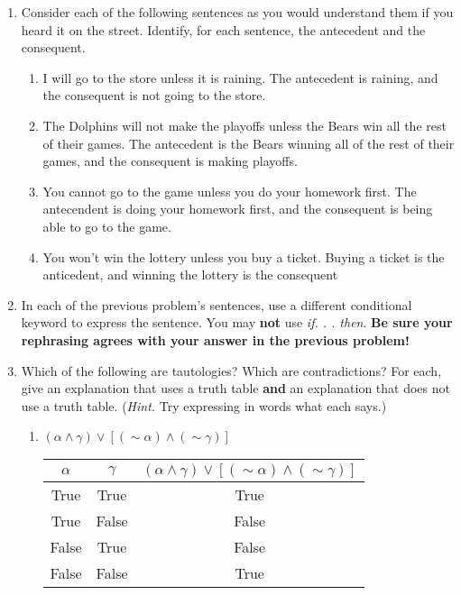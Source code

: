 \documentclass{letter}
\begin{document}
\begin{description}
\begin{enumerate}
\begin{enumerate}
	\end{enumerate}
	\item Consider each of the following sentences as you would understand them if you heard it on the street. Identify, for each sentence, the antecedent and the consequent.
			\begin{enumerate}\itemsep=1.25mm
				\item I will go to the store unless it is raining. The antecedent is raining, and the consequent is not going to the store.
				\item The Dolphins will not make the playoffs unless the Bears win all the rest of their games. The antecedent is the Bears winning all of the rest of their games, and the consequent is making playoffs. \\
				\item You cannot go to the game unless you do your homework first. The antecendent is doing your homework first, and the consequent is being able to go to the game. \\
				\item You won't win the lottery unless you buy a ticket. Buying a ticket is the anticedent, and winning the lottery is the consequent
			\end{enumerate}
	\item In each of the previous problem's sentences, use a different conditional keyword to express the sentence. You may {\bfseries not} use {\em if. . . then}. {\bfseries Be sure your rephrasing agrees with your answer in the previous problem!} \\
	\item Which of the following are tautologies? Which are contradictions? For each, give an explanation that uses a truth table {\bfseries and} an explanation that does not use a truth table. ({\em Hint.} Try expressing in words what each says.)
			\begin{enumerate}\itemsep=1.25mm
				\item $(\alpha\wedge \gamma)\vee \left[(\sim \alpha)\wedge(\sim\gamma)\right]$
                                  \begin{center}
                                  \begin{tabular}{||c|c|c||}
                                    \hline
                                    $\alpha$ & $\gamma$ & $(\alpha\wedge \gamma)\vee \left[(\sim \alpha)\wedge(\sim\gamma)\right]$ \\ \hline
                                    True & True & True \\ \hline
                                    True & False & False \\ \hline
                                    False & True & False \\ \hline
                                    False & False & True \\ \hline
                                    \end{tabular}
                                    \end{center}


\end{enumerate}
\end{enumerate}
\end{description}
\end{document}

